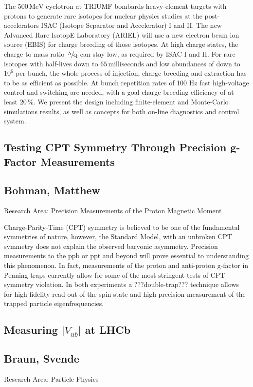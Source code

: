 \noindent The $500\,\textrm{MeV}$ cyclotron at TRIUMF bombards heavy-element targets with protons to generate rare isotopes for nuclear physics studies at the post-accelerators ISAC (Isotope Separator and Accelerator) I and II. The new Advanced Rare IsotopE Laboratory (ARIEL) will use a new electron beam ion source (EBIS) for charge breeding of those isotopes. At high charge states, the charge to mass ratio $\kern.1em\raise.5ex\hbox{\the\scriptfont0 A}\kern-.1em/\kern-.15em\lower.25ex\hbox{\the\scriptfont0 Q}$ can stay low, as required by ISAC I and II. For rare isotopes with half-lives down to $65\,\textrm{milliseconds}$ and low abundances of down to $10^6$ per bunch, the whole process of injection, charge breeding and extraction has to be as efficient as possible. At bunch repetition rates of 100 Hz fast high-voltage control and switching are needed, with a goal charge breeding efficiency of at least $20\,\%$. We present the design including finite-element and Monte-Carlo simulations results, as well as concepts for both on-line diagnostics and control system.
\newpage
\subsection*{\centering \large Testing CPT Symmetry Through Precision g-Factor Measurements}
\subsection*{\centering \normalsize Bohman, Matthew}
Research Area: Precision Measurements of the Proton Magnetic Moment\newline

\noindent Charge-Parity-Time (CPT) symmetry is believed to be one of the fundamental symmetries of nature, however, the Standard Model, with an unbroken CPT symmetry does not explain the observed baryonic asymmetry. Precision measurements to the ppb or ppt and beyond will prove essential to understanding this phenomenon. In fact, measurements of the proton and anti-proton g-factor in Penning traps currently allow for some of the most stringent tests of CPT symmetry violation. In both experiments a ???double-trap??? technique allows for high fidelity read out of the spin state and high precision measurement of the trapped particle eigenfrequencies.
\subsection*{\centering \large Measuring $|V_{ub}|$ at LHCb}
\subsection*{\centering \normalsize Braun, Svende}
Research Area: Particle Physics \newline

